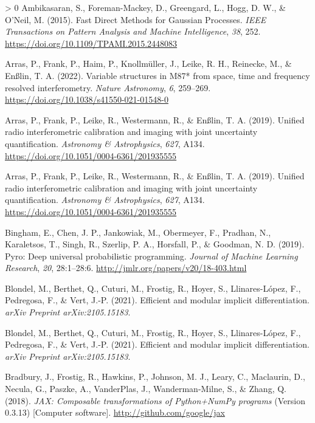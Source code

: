 \documentclass[10pt,a4paper,onecolumn]{article}
\newlength{\cslhangindent}
\newenvironment{CSLReferences}[3] %
 {%
  \setlength{\parindent}{0pt}
  \ifodd #1 \everypar{\setlength{\hangindent}{\cslhangindent}}\ignorespaces\fi
  \ifnum #2 > 0
  \setlength{\parskip}{#2\baselineskip}
  \fi
 }%
 {}
\begin{document}
\hypertarget{refs}{}
\begin{CSLReferences}{1}{0}
\leavevmode\hypertarget{ref-Sivaram2015}{}%
Ambikasaran, S., Foreman-Mackey, D., Greengard, L., Hogg, D. W., \&
O'Neil, M. (2015). {Fast Direct Methods for Gaussian Processes}.
\emph{IEEE Transactions on Pattern Analysis and Machine Intelligence},
\emph{38}, 252. \url{https://doi.org/10.1109/TPAMI.2015.2448083}

\leavevmode\hypertarget{ref-Arras2022}{}%
Arras, P., Frank, P., Haim, P., Knollmüller, J., Leike, R. H., Reinecke,
M., \& Enßlin, T. A. (2022). {Variable structures in M87* from space,
time and frequency resolved interferometry}. \emph{Nature Astronomy},
\emph{6}, 259--269. \url{https://doi.org/10.1038/s41550-021-01548-0}

\leavevmode\hypertarget{ref-Arras2019}{}%
Arras, P., Frank, P., Leike, R., Westermann, R., \& Enßlin, T. A.
(2019). {Unified radio interferometric calibration and imaging with
joint uncertainty quantification}. \emph{Astronomy \& Astrophysics},
\emph{627}, A134. \url{https://doi.org/10.1051/0004-6361/201935555}

\leavevmode\hypertarget{ref-Arras2019}{}%
Arras, P., Frank, P., Leike, R., Westermann, R., \& Enßlin, T. A.
(2019). {Unified radio interferometric calibration and imaging with
joint uncertainty quantification}. \emph{Astronomy \& Astrophysics},
\emph{627}, A134. \url{https://doi.org/10.1051/0004-6361/201935555}

\leavevmode\hypertarget{ref-Bingham2019}{}%
Bingham, E., Chen, J. P., Jankowiak, M., Obermeyer, F., Pradhan, N.,
Karaletsos, T., Singh, R., Szerlip, P. A., Horsfall, P., \& Goodman, N.
D. (2019). Pyro: Deep universal probabilistic programming. \emph{Journal
of Machine Learning Research}, \emph{20}, 28:1--28:6.
\url{http://jmlr.org/papers/v20/18-403.html}

\leavevmode\hypertarget{ref-Blondel2021}{}%
Blondel, M., Berthet, Q., Cuturi, M., Frostig, R., Hoyer, S.,
Llinares-López, F., Pedregosa, F., \& Vert, J.-P. (2021). Efficient and
modular implicit differentiation. \emph{arXiv Preprint
arXiv:2105.15183}.

\leavevmode\hypertarget{ref-Blondel2021}{}%
Blondel, M., Berthet, Q., Cuturi, M., Frostig, R., Hoyer, S.,
Llinares-López, F., Pedregosa, F., \& Vert, J.-P. (2021). Efficient and
modular implicit differentiation. \emph{arXiv Preprint
arXiv:2105.15183}.

\leavevmode\hypertarget{ref-Jax2018}{}%
Bradbury, J., Frostig, R., Hawkins, P., Johnson, M. J., Leary, C.,
Maclaurin, D., Necula, G., Paszke, A., VanderPlas, J., Wanderman-Milne,
S., \& Zhang, Q. (2018). \emph{{JAX}: Composable transformations of
{P}ython+{N}um{P}y programs} (Version 0.3.13) {[}Computer software{]}.
\url{http://github.com/google/jax}


\end{CSLReferences}
\end{document}
